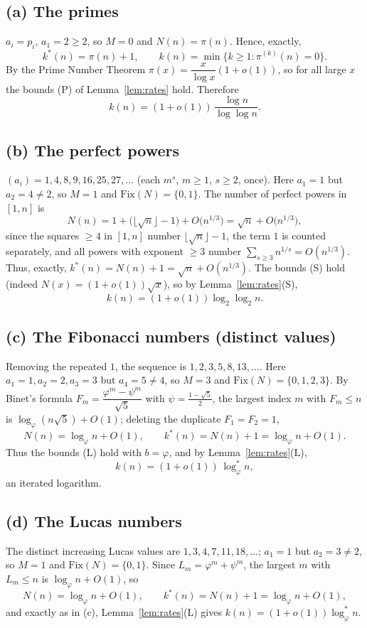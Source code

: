 \documentclass[12pt]{article}
\theoremstyle{definition}
\begin{document}
\subsection{(a) The primes}
$a_i=p_i$, $a_1=2\ge2$, so $M=0$ and $N(n)=\pi(n)$. Hence, exactly,
\[
  k^*(n)=\pi(n)+1,\qquad k(n)=\min\{k\ge1:\pi^{(k)}(n)=0\}.
\]
By the Prime Number Theorem $\pi(x)=\dfrac{x}{\log x}(1+o(1))$, so for all large $x$
the bounds (P) of Lemma~\ref{lem:rates} hold. Therefore
\[
  k(n)=(1+o(1))\,\frac{\log n}{\log\log n}.
\]

\subsection{(b) The perfect powers}
$(a_i)=1,4,8,9,16,25,27,\dots$ (each $m^s$, $m\ge1$, $s\ge2$, once). Here $a_1=1$ but
$a_2=4\ne2$, so $M=1$ and $\mathrm{Fix}(N)=\{0,1\}$. The number of perfect powers in
$[1,n]$ is
\[
  N(n)=1+\bigl(\lfloor\sqrt n\rfloor-1\bigr)+O\!\bigl(n^{1/3}\bigr)
      =\sqrt n+O\!\bigl(n^{1/3}\bigr),
\]
since the squares $\ge4$ in $[1,n]$ number $\lfloor\sqrt n\rfloor-1$, the term $1$ is
counted separately, and all powers with exponent $\ge3$ number
$\sum_{s\ge3}n^{1/s}=O(n^{1/3})$. Thus, exactly, $k^*(n)=N(n)+1=\sqrt n+O(n^{1/3})$.
The bounds (S) hold (indeed $N(x)=(1+o(1))\sqrt x$), so by Lemma~\ref{lem:rates}(S),
\[
  k(n)=(1+o(1))\log_2\log_2 n.
\]

\subsection{(c) The Fibonacci numbers (distinct values)}
Removing the repeated $1$, the sequence is $1,2,3,5,8,13,\dots$. Here $a_1=1,a_2=2,
a_3=3$ but $a_4=5\ne4$, so $M=3$ and $\mathrm{Fix}(N)=\{0,1,2,3\}$. By Binet's formula
$F_m=\dfrac{\varphi^m-\psi^m}{\sqrt5}$ with $\psi=\tfrac{1-\sqrt5}2$, the largest
index $m$ with $F_m\le n$ is $\log_\varphi(n\sqrt5)+O(1)$; deleting the duplicate
$F_1=F_2=1$,
\[
  N(n)=\log_\varphi n+O(1),\qquad k^*(n)=N(n)+1=\log_\varphi n+O(1).
\]
Thus the bounds (L) hold with $b=\varphi$, and by Lemma~\ref{lem:rates}(L),
\[
  k(n)=(1+o(1))\,\log^*_\varphi n,
\]
an iterated logarithm.

\subsection{(d) The Lucas numbers}
The distinct increasing Lucas values are $1,3,4,7,11,18,\dots$; $a_1=1$ but $a_2=3\ne2$,
so $M=1$ and $\mathrm{Fix}(N)=\{0,1\}$. Since $L_m=\varphi^m+\psi^m$, the largest $m$
with $L_m\le n$ is $\log_\varphi n+O(1)$, so
\[
  N(n)=\log_\varphi n+O(1),\qquad k^*(n)=N(n)+1=\log_\varphi n+O(1),
\]
and exactly as in (c), Lemma~\ref{lem:rates}(L) gives
$k(n)=(1+o(1))\log^*_\varphi n$.
\end{document}
